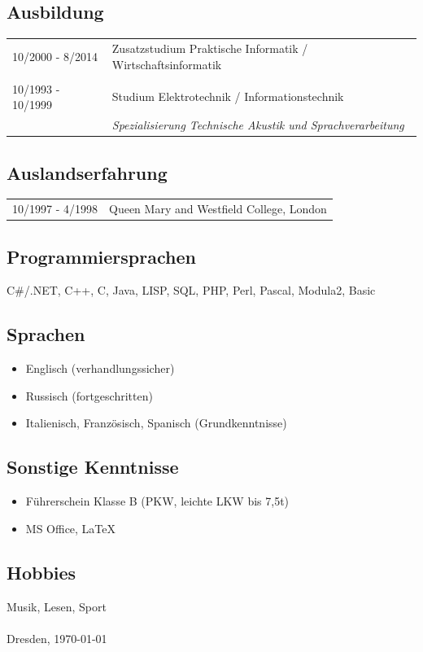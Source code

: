 \documentclass{article}
\begin{document}
\subsection*{Ausbildung}

\begin{tabular}{lp{15cm}}
10/2000 - 8/2014	& Zusatzstudium Praktische Informatik / Wirtschaftsinformatik\\
\\
10/1993 - 10/1999	& Studium Elektrotechnik / Informationstechnik\\
                    & \it{Spezialisierung Technische Akustik und Sprachverarbeitung}
\end{tabular}


\subsection*{Auslandserfahrung}
  \begin{tabular}{lp{15cm}}
    10/1997 - 4/1998	& Queen Mary and Westfield College, London
  \end{tabular}
	
\subsection*{Programmiersprachen}
  C\#/.NET, C++, C, Java, LISP, SQL, PHP, Perl, Pascal, Modula2, Basic
		
\subsection*{Sprachen}
  \begin{itemize}
    \item{Englisch (verhandlungssicher)}
    \item{Russisch (fortgeschritten)}
    \item{Italienisch, Französisch, Spanisch (Grundkenntnisse)}
  \end{itemize}

\subsection*{Sonstige Kenntnisse}
  \begin{itemize}
    \item{F\"uhrerschein Klasse B (PKW, leichte LKW bis 7,5t)}
    \item{MS Office, \LaTeX{}}
  \end{itemize}

\subsection*{Hobbies}
Musik, Lesen, Sport\\
\\
Dresden, %
\today
\end{document}
